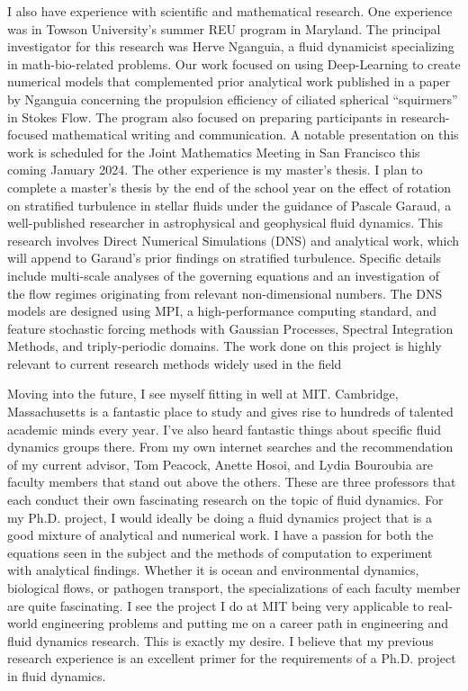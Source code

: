 \documentclass{article}
\begin{document}
I also have experience with scientific and mathematical research. One experience was in Towson University's summer REU program in Maryland. The principal investigator for this research was Herve Nganguia, a fluid dynamicist specializing in math-bio-related problems. Our work focused on using Deep-Learning to create numerical models that complemented prior analytical work published in a paper by Nganguia concerning the propulsion efficiency of ciliated spherical ``squirmers'' in Stokes Flow. The program also focused on preparing participants in research-focused mathematical writing and communication. A notable presentation on this work is scheduled for the Joint Mathematics Meeting in San Francisco this coming January 2024. The other experience is my master's thesis. I plan to complete a master's thesis by the end of the school year on the effect of rotation on stratified turbulence in stellar fluids under the guidance of Pascale Garaud, a well-published researcher in astrophysical and geophysical fluid dynamics. This research involves Direct Numerical Simulations (DNS) and analytical work, which will append to Garaud's prior findings on stratified turbulence. Specific details include multi-scale analyses of the governing equations and an investigation of the flow regimes originating from relevant non-dimensional numbers. The DNS models are designed using MPI, a high-performance computing standard, and feature stochastic forcing methods with Gaussian Processes, Spectral Integration Methods, and triply-periodic domains. The work done on this project is highly relevant to current research methods widely used in the field

Moving into the future, I see myself fitting in well at MIT. Cambridge, Massachusetts is a fantastic place to study and gives rise to hundreds of talented academic minds every year. I've also heard fantastic things about specific fluid dynamics groups there. From my own internet searches and the recommendation of my current advisor, Tom Peacock, Anette Hosoi, and Lydia Bouroubia are faculty members that stand out above the others. These are three professors that each conduct their own fascinating research on the topic of fluid dynamics. For my Ph.D. project, I would ideally be doing a fluid dynamics project that is a good mixture of analytical and numerical work. I have a passion for both the equations seen in the subject and the methods of computation to experiment with analytical findings. Whether it is ocean and environmental dynamics, biological flows, or pathogen transport, the specializations of each faculty member are quite fascinating. I see the project I do at MIT being very applicable to real-world engineering problems and putting me on a career path in engineering and fluid dynamics research. This is exactly my desire. I believe that my previous research experience is an excellent primer for the requirements of a Ph.D. project in fluid dynamics.  
\end{document}
